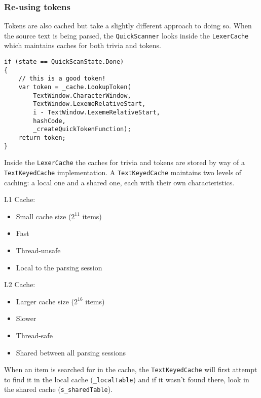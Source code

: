 \subsubsection{Re-using tokens}
\label{sec:re-use-tokens}

Tokens are also cached but take a slightly different approach to doing so. When the source text is being parsed, the \verb|QuickScanner| looks inside the \verb|LexerCache| which maintains caches for both trivia and tokens.

\begin{lstlisting}
if (state == QuickScanState.Done)
{
	// this is a good token!
	var token = _cache.LookupToken(
	    TextWindow.CharacterWindow,
	    TextWindow.LexemeRelativeStart,
	    i - TextWindow.LexemeRelativeStart,
	    hashCode,
	    _createQuickTokenFunction);
	return token;
}
\end{lstlisting}

Inside the \verb|LexerCache| the caches for trivia and tokens are stored by way of a \verb|TextKeyedCache| implementation. A \verb|TextKeyedCache| maintains two levels of caching: a local one and a shared one, each with their own characteristics.

\noindent L1 Cache:

\begin{itemize}
\item Small cache size ($2^{11}$ items)
\item Fast
\item Thread-unsafe
\item Local to the parsing session
\end{itemize}

\noindent L2 Cache:

\begin{itemize}
\item Larger cache size ($2^{16}$ items)
\item Slower
\item Thread-safe
\item Shared between all parsing sessions
\end{itemize}

\noindent When an item is searched for in the cache, the \verb|TextKeyedCache| will first attempt to find it in the local cache (\verb|_localTable|) and if it wasn't found there, look in the shared cache (\verb|s_sharedTable|).

